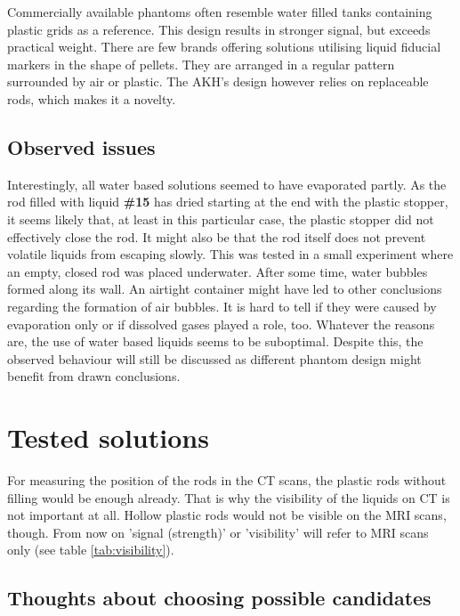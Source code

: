 Commercially available phantoms often resemble water filled tanks containing plastic grids as a reference.
This design results in stronger signal, but exceeds practical weight.
There are few brands offering solutions utilising liquid fiducial markers in the shape of pellets.
They are arranged in a regular pattern surrounded by air or plastic.
The AKH's design however relies on replaceable rods, which makes it a novelty.

\subsection{Observed issues}

Interestingly, all water based solutions seemed to have evaporated partly.
As the rod filled with liquid \textbf{\#15} has dried starting at the end with the plastic stopper, it seems likely that, at least in this particular case, the plastic stopper did not effectively close the rod.
It might also be that the rod itself does not prevent volatile liquids from escaping slowly.
This was tested in a small experiment where an empty, closed rod was placed underwater. 
After some time, water bubbles formed along its wall.
An airtight container might have led to other conclusions regarding the formation of air bubbles.
It is hard to tell if they were caused by evaporation only or if dissolved gases played a role, too.
Whatever the reasons are, the use of water based liquids seems to be suboptimal.
Despite this, the observed behaviour will still be discussed as different phantom design might benefit from drawn conclusions.

\section{Tested solutions}

For measuring the position of the rods in the CT scans, the plastic rods without filling would be enough already.
That is why the visibility of the liquids on CT is not important at all.
Hollow plastic rods would not be visible on the MRI scans, though.
From now on 'signal (strength)' or 'visibility' will refer to MRI scans only (see table \ref{tab:visibility}).

\subsection{Thoughts about choosing possible candidates}

